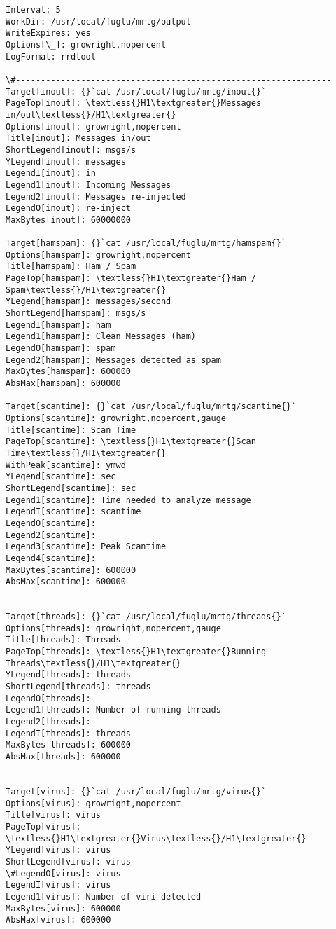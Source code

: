\documentclass[letterpaper,10pt,english]{sphinxmanual}
\begin{document}
\begin{Verbatim}[commandchars=\\\{\}]
Interval: 5
WorkDir: /usr/local/fuglu/mrtg/output
WriteExpires: yes
Options[\_]: growright,nopercent
LogFormat: rrdtool

\#---------------------------------------------------------------
Target[inout]: {}`cat /usr/local/fuglu/mrtg/inout{}`
PageTop[inout]: \textless{}H1\textgreater{}Messages in/out\textless{}/H1\textgreater{}
Options[inout]: growright,nopercent
Title[inout]: Messages in/out
ShortLegend[inout]: msgs/s
YLegend[inout]: messages
LegendI[inout]: in
Legend1[inout]: Incoming Messages
Legend2[inout]: Messages re-injected
LegendO[inout]: re-inject
MaxBytes[inout]: 60000000

Target[hamspam]: {}`cat /usr/local/fuglu/mrtg/hamspam{}`
Options[hamspam]: growright,nopercent
Title[hamspam]: Ham / Spam
PageTop[hamspam]: \textless{}H1\textgreater{}Ham / Spam\textless{}/H1\textgreater{}
YLegend[hamspam]: messages/second
ShortLegend[hamspam]: msgs/s
LegendI[hamspam]: ham
Legend1[hamspam]: Clean Messages (ham)
LegendO[hamspam]: spam
Legend2[hamspam]: Messages detected as spam
MaxBytes[hamspam]: 600000
AbsMax[hamspam]: 600000

Target[scantime]: {}`cat /usr/local/fuglu/mrtg/scantime{}`
Options[scantime]: growright,nopercent,gauge
Title[scantime]: Scan Time
PageTop[scantime]: \textless{}H1\textgreater{}Scan Time\textless{}/H1\textgreater{}
WithPeak[scantime]: ymwd
YLegend[scantime]: sec
ShortLegend[scantime]: sec
Legend1[scantime]: Time needed to analyze message
LegendI[scantime]: scantime
LegendO[scantime]:
Legend2[scantime]:
Legend3[scantime]: Peak Scantime
Legend4[scantime]:
MaxBytes[scantime]: 600000
AbsMax[scantime]: 600000


Target[threads]: {}`cat /usr/local/fuglu/mrtg/threads{}`
Options[threads]: growright,nopercent,gauge
Title[threads]: Threads
PageTop[threads]: \textless{}H1\textgreater{}Running Threads\textless{}/H1\textgreater{}
YLegend[threads]: threads
ShortLegend[threads]: threads
LegendO[threads]:
Legend1[threads]: Number of running threads
Legend2[threads]:
LegendI[threads]: threads
MaxBytes[threads]: 600000
AbsMax[threads]: 600000


Target[virus]: {}`cat /usr/local/fuglu/mrtg/virus{}`
Options[virus]: growright,nopercent
Title[virus]: virus
PageTop[virus]: \textless{}H1\textgreater{}Virus\textless{}/H1\textgreater{}
YLegend[virus]: virus
ShortLegend[virus]: virus
\#LegendO[virus]: virus
LegendI[virus]: virus
Legend1[virus]: Number of viri detected
MaxBytes[virus]: 600000
AbsMax[virus]: 600000
\end{Verbatim}
\end{document}
